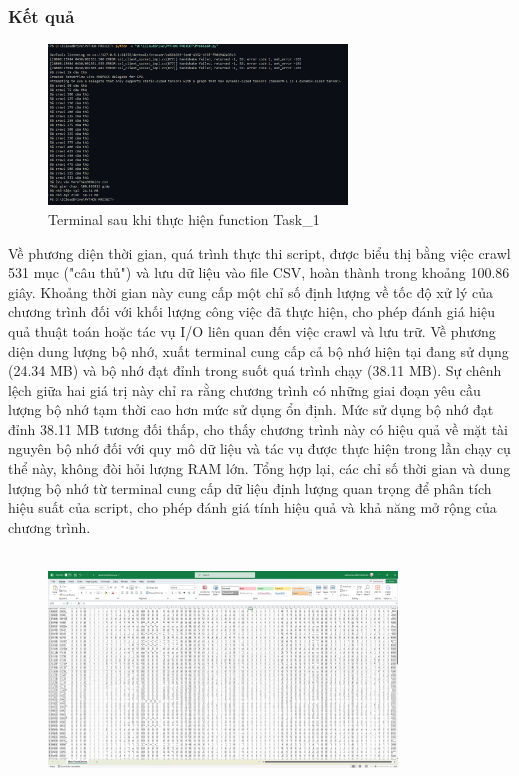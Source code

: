 \documentclass[12pt]{report}
\begin{document}
{\subsubsection{Kết quả}
\begin{figure}[h]
    \centering
    \includegraphics[width=300px]{Terminal_4.png}
    \caption{Terminal sau khi thực hiện function Task\_1}
    \label{fig:res2}
\end{figure}
Về phương diện thời gian, quá trình thực thi script, được biểu thị bằng việc crawl 531 mục ("câu thủ") và lưu dữ liệu vào file CSV, hoàn thành trong khoảng 100.86 giây. Khoảng thời gian này cung cấp một chỉ số định lượng về tốc độ xử lý của chương trình đối với khối lượng công việc đã thực hiện, cho phép đánh giá hiệu quả thuật toán hoặc tác vụ I/O liên quan đến việc crawl và lưu trữ. Về phương diện dung lượng bộ nhớ, xuất terminal cung cấp cả bộ nhớ hiện tại đang sử dụng (24.34 MB) và bộ nhớ đạt đỉnh trong suốt quá trình chạy (38.11 MB). Sự chênh lệch giữa hai giá trị này chỉ ra rằng chương trình có những giai đoạn yêu cầu lượng bộ nhớ tạm thời cao hơn mức sử dụng ổn định. Mức sử dụng bộ nhớ đạt đỉnh 38.11 MB tương đối thấp, cho thấy chương trình này có hiệu quả về mặt tài nguyên bộ nhớ đối với quy mô dữ liệu và tác vụ được thực hiện trong lần chạy cụ thể này, không đòi hỏi lượng RAM lớn. Tổng hợp lại, các chỉ số thời gian và dung lượng bộ nhớ từ terminal cung cấp dữ liệu định lượng quan trọng để phân tích hiệu suất của script, cho phép đánh giá tính hiệu quả và khả năng mở rộng của chương trình.\\\\
\begin{figure}[h]
    \centering
    \includegraphics[width=350px]{P4_RES.png}

\end{figure}}
\end{document}
